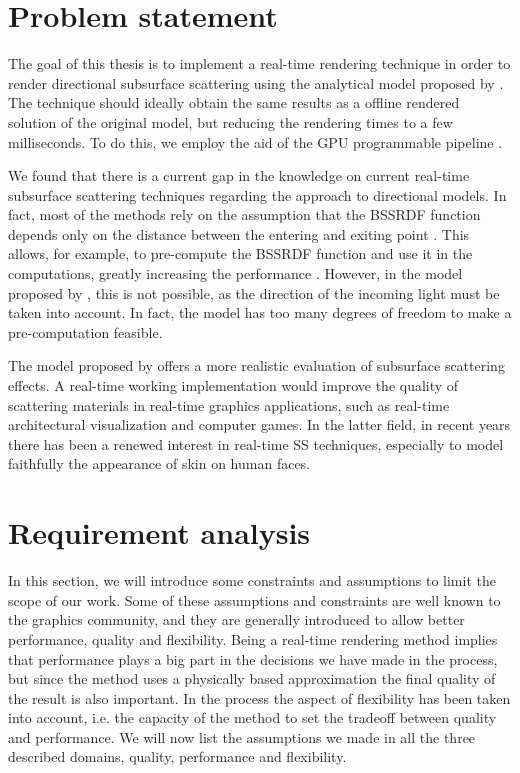 \section{Problem statement}

The goal of this thesis is to implement a real-time rendering technique in order to render directional subsurface scattering using the analytical model proposed by \cite{IMM2013-06646}. The technique should ideally obtain the same results as a offline rendered solution of the original model, but reducing the rendering times to a few milliseconds. To do this, we employ the aid of the GPU programmable pipeline \citep{Fernando:2004:GGP:983868}. 

We found that there is a current gap in the knowledge on current real-time subsurface scattering techniques regarding the approach to directional models. In fact, most of the methods rely on the assumption that the BSSRDF function depends only on the distance between the entering and exiting point \cite{Jensen:2001:PMS:383259.383319}. This allows, for example, to pre-compute the BSSRDF function and use it in the computations, greatly increasing the performance \citep{4736459}. However, in the model proposed by \cite{IMM2013-06646}, this is not possible, as the direction of the incoming light must be taken into account. In fact, the model has too many degrees of freedom to make a pre-computation feasible. 

The model proposed by \cite{IMM2013-06646} offers a more realistic evaluation of subsurface scattering effects. A real-time working implementation would improve the quality of scattering materials in real-time graphics applications, such as real-time architectural visualization and computer games. In the latter field, in recent years there has been a renewed interest in real-time SS techniques, especially to model faithfully the appearance of skin on human faces. 

\section{Requirement analysis}

In this section, we will introduce some constraints and assumptions to limit the scope of our work. Some of these assumptions and constraints are well known to the graphics community, and they are generally introduced to allow better performance, quality and flexibility. Being a real-time rendering method implies that performance plays a big part in the decisions we have made in the process, but since the method uses a physically based approximation the final quality of the result is also important. In the process the aspect of flexibility has been taken into account, i.e. the capacity of the method to set the tradeoff between quality and performance. We will now list the assumptions we made in all the three described domains, quality, performance and flexibility. 

